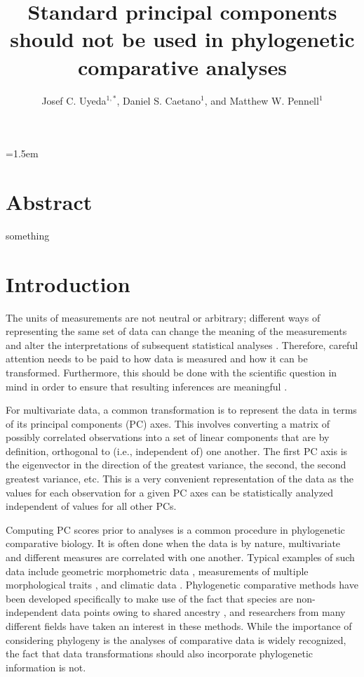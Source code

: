\documentclass[a4paper,12pt]{article}
\title{Standard principal components should not be used in phylogenetic comparative analyses}
\author{
Josef C. Uyeda$^{1,*}$, Daniel S. Caetano$^1$, and Matthew W. Pennell$^1$
}
\date{}
\affiliation{
 $^{1}$ Department of Biological Sciences \& Institute for Bioinformatics and Evolutionary Studies, University of Idaho, Moscow, ID 83844, U.S.A.\\ 
 $^{*}$ Email for correspondence: \texttt{pseudacris@gmail.com}\\
}
\begin{document}
\mstitlepage
\parindent=1.5em
\addtolength{\parskip}{.3em}
\vfill

\section{Abstract}
something
\vfill

\newpage

\section{Introduction}
The units of measurements are not neutral or arbitrary; different ways of representing the same set of data can change the meaning of the measurements and alter the interpretations of subsequent statistical analyses \citep{Hand2004, HansenHoule2008, Houle2011}. Therefore, careful attention needs to be paid to how data is measured and how it can be transformed. Furthermore, this should be done with the scientific question in mind in order to ensure that resulting inferences are meaningful \citep{Houle2011}. 

For multivariate data, a common transformation is to represent the data in terms of its principal components (PC) axes. This involves converting a matrix of possibly correlated observations into a set of linear components that are by definition, orthogonal to (i.e., independent of) one another. The first PC axis is the eigenvector in the direction of the greatest variance, the second, the second greatest variance, etc. This is a very convenient representation of the data as the values for each observation for a given PC axes can be statistically analyzed independent of values for all other PCs. 

Computing PC scores prior to analyses is a common procedure in phylogenetic comparative biology. It is often done when the data is by nature, multivariate and different measures are correlated with one another. Typical examples of such data include geometric morphometric data \citep[e.g.,][]{Dornburg2011, Hunt2013}, measurements of multiple morphological traits \citep[e.g.,][]{Harmon2010, BergmannIrshick2012, Weir2012, Pienaar2013}, and climatic data \citep[e.g.,][]{KozakWiens2010, Schnitzler2012}. Phylogenetic comparative methods \citep[PCMs; recently reviewed by][]{PennellHarmon} have been developed specifically to make use of the fact that species are non-independent data points owing to shared ancestry \citep{Felsenstein1985}, and researchers from many different fields have taken an interest in these methods. While the importance of considering phylogeny is the analyses of comparative data is widely recognized, the fact that data transformations should also incorporate phylogenetic information is not.
\end{document}
